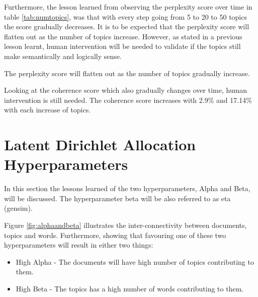 Furthermore, the lesson learned from observing the perplexity score over time in table \ref{tab:numtopics}, was that with every step going from 5 to 20 to 50 topics the score gradually decreases. It is to be expected that the perplexity score will flatten out as the number of topics increase. However, as stated in a previous lesson learnt, human intervention will be needed to validate if the topics still make semantically and logically sense.

\begin{lesson}
The perplexity score will flatten out as the number of topics gradually increase.
\end{lesson}\label{L:perplexity}

Looking at the coherence score which also gradually changes over time, human intervention is still needed. The coherence score increases with 2.9\% and 17.14\% with each increase of topics.

\section{Latent Dirichlet Allocation Hyperparameters}
In this section the lessons learned of the two hyperparameters, Alpha and Beta, will be discussed. The hyperparameter beta will be also referred to as eta (gensim).

Figure \ref{fig:alphaandbeta} illustrates the inter-connectivity between documents, topics and words. Furthermore, showing that favouring one of these two hyperparameters will result in either two things:
\begin{itemize}
    \item High Alpha - The documents will have high number of topics contributing to them.
    \item High Beta - The topics has a high number of words contributing to them.
\end{itemize}

